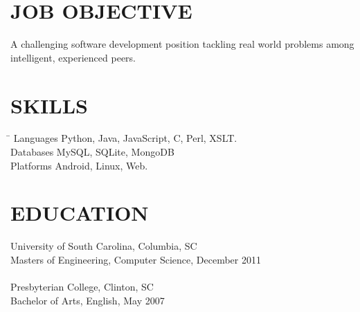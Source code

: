 \documentclass{res}
\begin{document}
 


\address{\bf  PRESENT ADDRESS\\832 NW 10th Ave.\\Gainesville, FL 32601}
\address{\bf PERMANENT ADDRESS \\ 1210 Fairview Dr.\\Columbia, SC 29205\\(803) 487-7247}
                                  
\begin{resume}

\section{JOB OBJECTIVE}          
    A challenging software development position tackling real world problems among intelligent, experienced peers. 
 
\section{SKILLS} 
   \vspace{-0.1in}	         
 \begin{tabbing}%
   \hspace{1.2in}\= \kill
    Languages \>Python, Java, JavaScript, C, Perl, XSLT. \\
    Databases \>MySQL, SQLite, MongoDB\\
    Platforms \>Android, Linux, Web.\\    
  \end{tabbing}
  \vspace{-0.3in}	 
  
\section{EDUCATION}          
    University of South Carolina, Columbia, SC  \\        
    Masters of Engineering, Computer Science, December 2011   \\       
    \\Presbyterian College, Clinton, SC\\
    Bachelor of Arts, English, May 2007

 

\end{resume}
\end{document}
